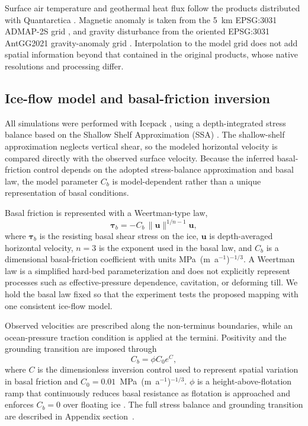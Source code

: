 \documentclass[review,jog]{igs}
\begin{document}
Surface air temperature and geothermal heat flux follow the products distributed with Quantarctica \citep{matsuoka2018quantarctica,comiso2000variability,an2015temperature}. Magnetic anomaly is taken from the 5~km EPSG:3031 ADMAP-2S grid \citep{eagles2024admap}, and gravity disturbance from the oriented EPSG:3031 AntGG2021 gravity-anomaly grid \citep{scheinert2024antgg}. %
Interpolation to the model grid does not add spatial information beyond that contained in the original products, whose native resolutions and processing differ.

\subsection{Ice-flow model and basal-friction inversion}

All simulations were performed with Icepack \citep{shapero2021icepack}, using a depth-integrated stress balance based on the Shallow Shelf Approximation (SSA) \citep{macayeal1989large}. The shallow-shelf approximation neglects vertical shear, so the modeled horizontal velocity is compared directly with the observed surface velocity. Because the inferred basal-friction control depends on the adopted stress-balance approximation and basal law, the model parameter $C_b$ is model-dependent rather than a unique representation of basal conditions.

Basal friction is represented with a Weertman-type law,
\begin{equation}
\label{eq:weertman}
\boldsymbol{\tau}_b=-C_b\,\lVert\mathbf{u}\rVert^{1/n-1}\mathbf{u},
\end{equation}
where $\boldsymbol{\tau}_b$ is the resisting basal shear stress on the ice, $\mathbf{u}$ is depth-averaged horizontal velocity, $n=3$ is the exponent used in the basal law, and $C_b$ is a dimensional basal-friction coefficient with units MPa~(m~a$^{-1}$)$^{-1/3}$. A Weertman law is a simplified hard-bed parameterization and does not explicitly represent processes such as effective-pressure dependence, cavitation, or deforming till. We hold the basal law fixed so that the experiment tests the proposed mapping with one consistent ice-flow model.

Observed velocities are prescribed along the non-terminus boundaries, while an ocean-pressure traction condition is applied at the termini. Positivity and the grounding transition are imposed through
\begin{equation}
\label{eq:friction_parameterization}
C_b=\phi C_0 e^{C},
\end{equation}
where $C$ is the dimensionless inversion control used to represent spatial variation in basal friction and $C_0=0.01$~MPa~(m~a$^{-1}$)$^{-1/3}$. $\phi$ is a height-above-flotation ramp that continuously reduces basal resistance as flotation is approached and enforces $C_b=0$ over floating ice \citep{leguy2014parameterization,seroussi2014hydrostatic}. The full stress balance and grounding transition are described in Appendix section~. 
\end{document}
